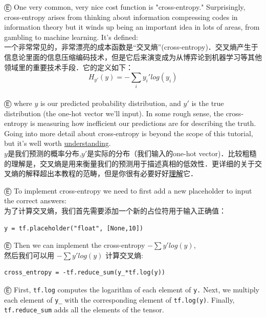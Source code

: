 Ⓔ One very common, very nice cost function is "cross-entropy." Surprisingly, cross-entropy arises from thinking about information compressing codes in information theory but it winds up being an important idea in lots of areas, from gambling to machine learning. It's defined:\\
一个非常常见的，非常漂亮的成本函数是“交叉熵”(cross-entropy)．交叉熵产生于信息论里面的信息压缩编码技术，但是它后来演变成为从博弈论到机器学习等其他领域里的重要技术手段．它的定义如下：
\\
\begin{equation}
H_{y'}(y) = -\sum_i{y_{i}'log(y_i)}
\end{equation}
\\
Ⓔ where $y$ is our predicted probability distribution, and $y'$ is the true distribution (the one-hot vector we'll input). In some rough sense, the cross-entropy is measuring how inefficient our predictions are for describing the truth. Going into more detail about cross-entropy is beyond the scope of this tutorial, but it's well worth \href{http://colah.github.io/posts/2015-09-Visual-Information/}{understanding}.
\\
$y$是我们预测的概率分布,$y'$是实际的分布（我们输入的one-hot vector)．比较粗糙的理解是，交叉熵是用来衡量我们的预测用于描述真相的低效性．更详细的关于交叉熵的解释超出本教程的范畴，但是你很有必要好好\href{http://colah.github.io/posts/2015-09-Visual-Information/}{理解}它．

Ⓔ To implement cross-entropy we need to first add a new placeholder to input the correct answers:\\
为了计算交叉熵，我们首先需要添加一个新的占位符用于输入正确值：
\\
\begin{lstlisting}
y = tf.placeholder("float", [None,10])
\end{lstlisting}
Ⓔ Then we can implement the cross-entropy $-\sum{y'log(y)}$,\\
然后我们可以用 $-\sum{y'log(y)}$ 计算交叉熵:

\begin{lstlisting}
cross_entropy = -tf.reduce_sum(y_*tf.log(y))
\end{lstlisting}

Ⓔ First, \lstinline{tf.log} computes the logarithm of each element of \lstinline{y.} Next, we multiply each element of \lstinline{y_} with the corresponding element of \lstinline{tf.log(y)}. Finally, \lstinline{tf.reduce_sum} adds all the elements of the tensor.

